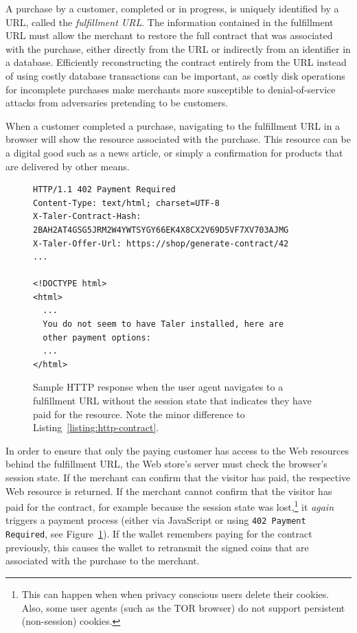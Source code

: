 \documentclass{llncs}
\begin{document}
A purchase by a customer, completed or in progress, is uniquely
identified by a URL, called the \emph{fulfillment URL}.  The
information contained in the fulfillment URL must allow the merchant
to restore the full contract that was associated with the purchase,
either directly from the URL or indirectly from an identifier in a
database.  Efficiently reconstructing the contract entirely from the
URL instead of using costly database transactions can be important, as
costly disk operations for incomplete purchases make merchants
more susceptible to denial-of-service attacks from adversaries
pretending to be customers.

When a customer completed a purchase, navigating to the fulfillment
URL in a browser will show the resource associated with the purchase.
This resource can be a digital good such as a news article, or simply
a confirmation for products that are delivered by other means.

\begin{figure}[t!]
\begin{lstlisting}
HTTP/1.1 402 Payment Required
Content-Type: text/html; charset=UTF-8
X-Taler-Contract-Hash: 2BAH2AT4GSG5JRM2W4YWTSYGY66EK4X8CX2V69D5VF7XV703AJMG
X-Taler-Offer-Url: https://shop/generate-contract/42
...

<!DOCTYPE html>
<html>
  ...
  You do not seem to have Taler installed, here are
  other payment options:
  ...
</html>
\end{lstlisting}
\caption{Sample HTTP response when the user agent navigates to a
  fulfillment URL without
  the session state that indicates they have paid for the resource.
  Note the minor difference to Listing~\ref{listing:http-contract}.}
  \label{listing:http-execute}
\end{figure}

In order to ensure that only the paying customer has access to the Web
resources behind the fulfillment URL, the Web store's server must
check the browser's session state.  If the merchant can confirm that
the visitor has paid, the respective Web resource is returned.  If the
merchant cannot confirm that the visitor has paid for the contract,
for example because the session state was lost,\footnote{This can
  happen when when privacy conscious users delete their cookies.
  Also, some user agents (such as the TOR browser) do not support
  persistent (non-session) cookies.} it {\em again} triggers a payment
process (either via JavaScript or using {\tt 402 Payment Required}, see Figure~\ref{listing:http-execute}).
If the wallet remembers paying for the contract previously, this
causes the wallet to retransmit the signed coins that are associated
with the purchase to the merchant.
\end{document}
